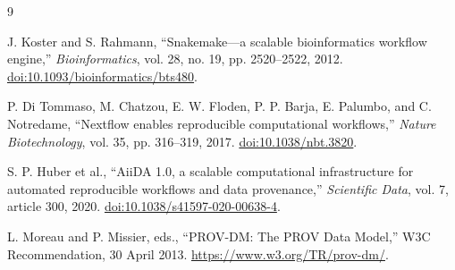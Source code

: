 \documentclass[10pt]{article}
\begin{document}
\begin{thebibliography}{9}

J. Koster and S. Rahmann,
``Snakemake---a scalable bioinformatics workflow engine,''
\emph{Bioinformatics}, vol. 28, no. 19, pp. 2520--2522, 2012.
\href{https://doi.org/10.1093/bioinformatics/bts480}{doi:10.1093/bioinformatics/bts480}.

P. Di Tommaso, M. Chatzou, E. W. Floden, P. P. Barja, E. Palumbo, and C. Notredame,
``Nextflow enables reproducible computational workflows,''
\emph{Nature Biotechnology}, vol. 35, pp. 316--319, 2017.
\href{https://doi.org/10.1038/nbt.3820}{doi:10.1038/nbt.3820}.

S. P. Huber et al.,
``AiiDA 1.0, a scalable computational infrastructure for automated reproducible workflows and data provenance,''
\emph{Scientific Data}, vol. 7, article 300, 2020.
\href{https://doi.org/10.1038/s41597-020-00638-4}{doi:10.1038/s41597-020-00638-4}.

L. Moreau and P. Missier, eds.,
``PROV-DM: The PROV Data Model,'' W3C Recommendation, 30 April 2013.
\url{https://www.w3.org/TR/prov-dm/}.

\end{thebibliography}
\end{document}
